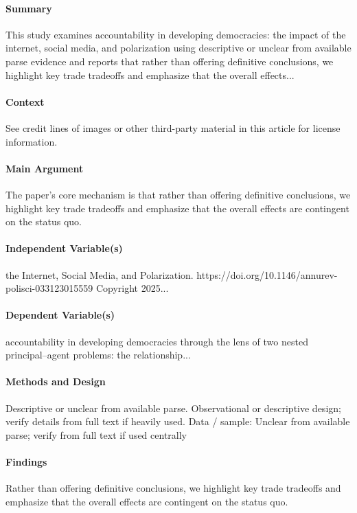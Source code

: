 \documentclass[12pt]{article}
\begin{document}
\paragraph{Summary} This study examines accountability in developing democracies: the impact of the internet, social media, and polarization using descriptive or unclear from available parse evidence and reports that rather than offering definitive conclusions, we highlight key trade tradeoffs and emphasize that the overall effects...

\paragraph{Context} See credit lines of images or other third-party material in this article for license information.

\paragraph{Main Argument} The paper's core mechanism is that rather than offering definitive conclusions, we highlight key trade tradeoffs and emphasize that the overall effects are contingent on the status quo.

\paragraph{Independent Variable(s)} the Internet, Social Media, and Polarization. https://doi.org/10.1146/annurev-polisci-033123015559 Copyright  2025...

\paragraph{Dependent Variable(s)} accountability in developing democracies through the lens of two nested principal--agent problems: the relationship...

\paragraph{Methods and Design} Descriptive or unclear from available parse. Observational or descriptive design; verify details from full text if heavily used. Data / sample: Unclear from available parse; verify from full text if used centrally

\paragraph{Findings} Rather than offering definitive conclusions, we highlight key trade tradeoffs and emphasize that the overall effects are contingent on the status quo.
\end{document}
